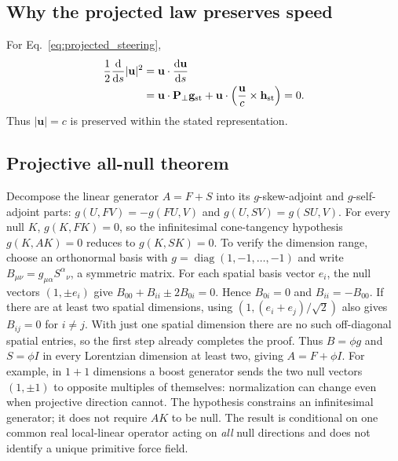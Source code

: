 \documentclass[11pt]{article}
\theoremstyle{definition}
\newcommand{\dd}{\mathrm{d}}
\begin{document}
\subsection{Why the projected law preserves speed}
\label{subsec:speed-proof}
For Eq.~\eqref{eq:projected_steering},
\begin{align}
\frac{1}{2}\frac{\dd}{\dd s}|\mathbf u|^2
&=\mathbf u\cdot\frac{\dd\mathbf u}{\dd s}\\
&=\mathbf u\cdot\mathbf P_\perp\mathbf g_{\rm st}
+\mathbf u\cdot\left(\frac{\mathbf u}{c}\times\mathbf h_{\rm st}\right)=0.
\end{align}
Thus $|\mathbf u|=c$ is preserved within the stated representation.

\subsection{Projective all-null theorem}
\label{subsec:all-null-proof}
Decompose the linear generator $A=F+S$ into its $g$-skew-adjoint and $g$-self-adjoint
parts: $g(U,FV)=-g(FU,V)$ and $g(U,SV)=g(SU,V)$.  For every null $K$,
$g(K,FK)=0$, so the infinitesimal cone-tangency hypothesis $g(K,AK)=0$
reduces to $g(K,SK)=0$.  To verify the dimension range, choose an orthonormal
basis with $g=\operatorname{diag}(1,-1,\ldots,-1)$ and write
$B_{\mu\nu}=g_{\mu\alpha}S^\alpha{}_{\nu}$, a symmetric matrix.
For each spatial basis vector $e_i$, the null vectors $(1,\pm e_i)$ give
$B_{00}+B_{ii}\pm2B_{0i}=0$.  Hence $B_{0i}=0$ and
$B_{ii}=-B_{00}$.  If there are at least two spatial dimensions, using
$(1,(e_i+e_j)/\sqrt2)$ also gives $B_{ij}=0$ for $i\ne j$.
With just one spatial dimension there are no such off-diagonal spatial entries,
so the first step already completes the proof.  Thus $B=\phi g$ and
$S=\phi I$ in every Lorentzian dimension at least two, giving $A=F+\phi I$.
For example, in $1+1$ dimensions a boost generator sends the two null vectors
$(1,\pm1)$ to opposite multiples of themselves: normalization can change even
when projective direction cannot.  The
hypothesis constrains an infinitesimal generator; it does not require $AK$ to be
null.  The result is conditional on one common real local-linear operator acting
on \emph{all} null directions and does not identify a unique primitive force field.
\end{document}
